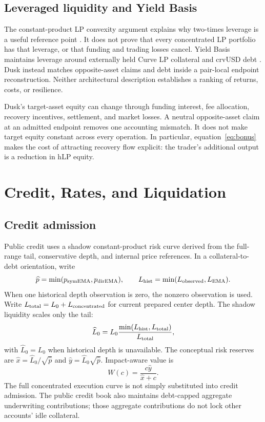 \ifexpanded
\subsection{Leveraged liquidity and Yield Basis}

The constant-product LP convexity argument explains why two-times leverage is a useful reference point \cite{egorov-yieldbasis-whitepaper}. It does not prove that every concentrated LP portfolio has that leverage, or that funding and trading losses cancel. Yield Basis maintains leverage around externally held Curve LP collateral and crvUSD debt \cite{yieldbasis-technical}. Dusk instead matches opposite-asset claims and debt inside a pair-local endpoint reconstruction. Neither architectural description establishes a ranking of returns, costs, or resilience.

Dusk's target-asset equity can change through funding interest, fee allocation, recovery incentives, settlement, and market losses. A neutral opposite-asset claim at an admitted endpoint removes one accounting mismatch. It does not make target equity constant across every operation. In particular, equation~\eqref{eq:bonus} makes the cost of attracting recovery flow explicit: the trader's additional output is a reduction in hLP equity.
\fi

\section{Credit, Rates, and Liquidation}

\subsection{Credit admission}

Public credit uses a shadow constant-product risk curve derived from the full-range tail, conservative depth, and internal price references. In a collateral-to-debt orientation, write
\begin{equation}
\widehat p=\min(p_{\rm symEMA},p_{\rm dirEMA}),\qquad
L_{\rm hist}=\min(L_{\rm observed},L_{\rm EMA}).
\end{equation}
When one historical depth observation is zero, the nonzero observation is used. Write $L_{\rm total}=L_0+L_{\rm concentrated}$ for current prepared center depth. The shadow liquidity scales only the tail:
\begin{equation}
\widehat L_0=L_0\frac{\min(L_{\rm hist},L_{\rm total})}{L_{\rm total}},
\end{equation}
with $\widehat L_0=L_0$ when historical depth is unavailable. The conceptual risk reserves are $\widehat x=\widehat L_0/\sqrt{\widehat p}$ and $\widehat y=\widehat L_0\sqrt{\widehat p}$. Impact-aware value is
\begin{equation}
W(c)=\frac{c\widehat y}{\widehat x+c}.
\label{eq:risk}
\end{equation}
The full concentrated execution curve is not simply substituted into credit admission. The public credit book also maintains debt-capped aggregate underwriting contributions; those aggregate contributions do not lock other accounts' idle collateral.

